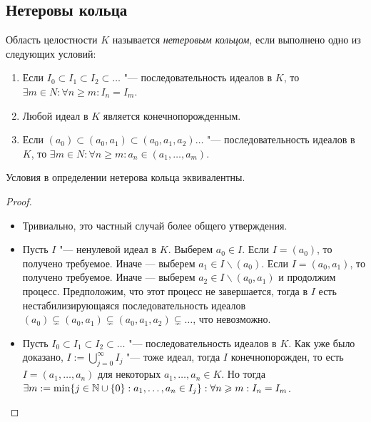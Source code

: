 \subsection{Нетеровы кольца}

\begin{definition}
	Область целостности $K$ называется \textit{нетеровым кольцом}, если выполнено одно из следующих условий:
	\begin{enumerate}
		\item Если $I_0 \subset I_1 \subset I_2 \subset \dots$ "--- последовательность идеалов в $K$, то $\exists m \in N: \forall n \ge m: I_n = I_m$.
		\item Любой идеал в $K$ является конечнопорожденным.
		\item Если $(a_0) \subset (a_0, a_1) \subset (a_0, a_1, a_2) \dots$ "--- последовательность идеалов в $K$, то $\exists m \in N: \forall n \ge m: a_n \in (a_1, \dotsc, a_m)$.
	\end{enumerate}
\end{definition}

\begin{proposition}
	Условия в определении нетерова кольца эквивалентны.
\end{proposition}

\begin{proof}~
	\begin{itemize}
		\item{}Тривиально, это частный случай более общего утверждения.
		\item{}Пусть $I$ "--- ненулевой идеал в $K$. Выберем $a_0 \in I$. Если $I = (a_0)$, то получено требуемое. Иначе --- выберем $a_1 \in I \backslash (a_0)$. Если $I = (a_0, a_1)$, то получено требуемое. Иначе --- выберем $a_2 \in I \backslash (a_0, a_1)$ и продолжим процесс. Предположим, что этот процесс не завершается, тогда в $I$ есть нестабилизирующаяся последовательность идеалов $(a_0) \subsetneq (a_0, a_1) \subsetneq (a_0, a_1, a_2) \subsetneq \dotsc$, что невозможно.
		\item{}Пусть $I_0 \subset I_1 \subset I_2 \subset \dots$ "--- последовательность идеалов в $K$. Как уже было доказано, $I := \bigcup_{j = 0}^\infty I_j$ "--- тоже идеал, тогда $I$ конечнопорожден, то есть $I = (a_1, \dotsc, a_n)$ для некоторых $a_1, \dotsc, a_n \in K$. Но тогда $\exists m := \min\{j \in \mathbb{N} \cup \{0\} : a_1, \dotsc, a_n \in I_j\}: \forall n \geqslant m: I_n = I_m$.\qedhere
	\end{itemize}
\end{proof}

